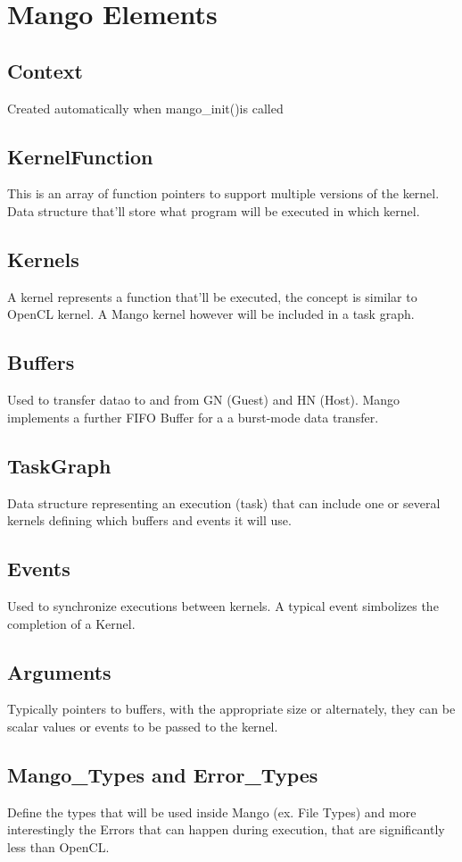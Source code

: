 \documentclass[a4paper]{article}
\begin{document}
\section{Mango Elements}
\subsection{Context}
Created automatically when \ttfamily mango\_init()\rmfamily is called
\subsection{KernelFunction}
This is an array of function pointers to support multiple versions of the kernel. Data structure that'll store what program will be executed in which kernel.
\subsection{Kernels}
A kernel represents a function that'll be executed, the concept is similar to OpenCL kernel. A Mango kernel however will be included in a task graph.
\subsection{Buffers}
Used to transfer datao to and from GN (Guest) and HN (Host). Mango implements a further FIFO Buffer for a a burst-mode data transfer.
\subsection{TaskGraph}
Data structure representing an execution (task) that can include one or several kernels defining which buffers and events it will use.
\subsection{Events}
Used to synchronize executions between kernels. A typical event simbolizes the completion of a Kernel.
\subsection{Arguments}
Typically pointers to buffers, with the appropriate size or alternately, they can be scalar values or events to be passed to the kernel.
\subsection{Mango\_Types and Error\_Types}
Define the types that will be used inside Mango (ex. File Types) and more interestingly the Errors that can happen during execution, that are significantly less than OpenCL. 
\end{document}
